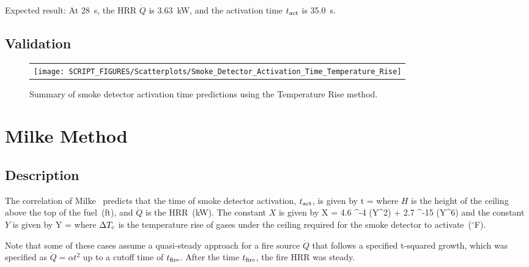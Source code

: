 \noindent Expected result: At 28~s, the HRR $\dot Q$ is 3.63~kW, and the activation time $t\sb{act}$ is 35.0~s.


\clearpage


\subsection*{Validation}

\begin{figure}[!ht]
\begin{center}
\begin{tabular}{l}
\texttt{[image: SCRIPT\_FIGURES/Scatterplots/Smoke\_Detector\_Activation\_Time\_Temperature\_Rise]}
\end{tabular}
\end{center}
\caption[Summary of smoke detector activation time predictions]
{Summary of smoke detector activation time predictions using the Temperature Rise method.}
\label{Smoke_Detector_Activation_Summary_Temperature_Rise}
\end{figure}


\clearpage


\section{Milke Method}

\subsection*{Description}

The correlation of Milke~\cite{Milke:1} predicts that the time of smoke detector activation, $t\sb{act}$, is given by
\be
t = 
\label{eq:Milke}
\ee
where $H$ is the height of the ceiling above the top of the fuel~(\si{ft}), and $\dot Q$ is the HRR~(\si{kW}). The constant $X$ is given by
\be
X = 4.6 ^{-4} (Y^2) + 2.7 ^{-15} (Y^6)
\label{eq:Milke_X}
\ee
and the constant $Y$ is given by
\be
Y = 
\label{eq:Milke_Y}
\ee
where $\Delta T\sb{c}$ is the temperature rise of gases under the ceiling required for the smoke detector to activate~($^\circ$F).

Note that some of these cases assume a quasi-steady approach for a fire source $\dot Q$ that follows a specified t-squared growth, which was specified as $\dot Q = \alpha t^2$ up to a cutoff time of $t\sb{fire}$. After the time $t\sb{fire}$, the fire HRR was steady.

